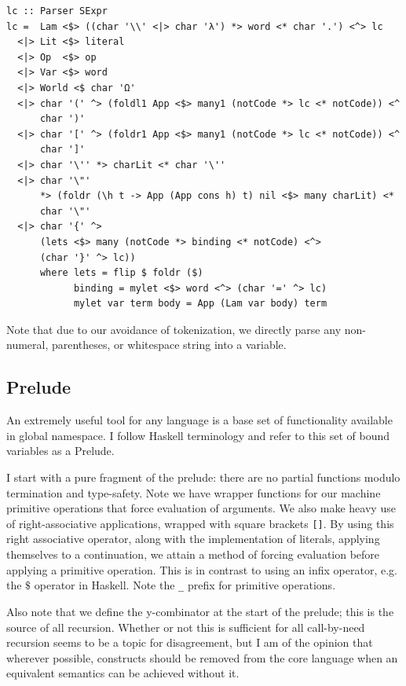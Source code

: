 \begin{verbatim}
lc :: Parser SExpr
lc =  Lam <$> ((char '\\' <|> char 'λ') *> word <* char '.') <^> lc
  <|> Lit <$> literal
  <|> Op  <$> op
  <|> Var <$> word
  <|> World <$ char 'Ω'
  <|> char '(' ^> (foldl1 App <$> many1 (notCode *> lc <* notCode)) <^ 
      char ')'
  <|> char '[' ^> (foldr1 App <$> many1 (notCode *> lc <* notCode)) <^ 
      char ']'
  <|> char '\'' *> charLit <* char '\''
  <|> char '\"' 
      *> (foldr (\h t -> App (App cons h) t) nil <$> many charLit) <* 
      char '\"'
  <|> char '{' ^> 
      (lets <$> many (notCode *> binding <* notCode) <^> 
      (char '}' ^> lc))
      where lets = flip $ foldr ($)
            binding = mylet <$> word <^> (char '=' ^> lc)
            mylet var term body = App (Lam var body) term
\end{verbatim}

Note that due to our avoidance of tokenization, we directly parse any
non-numeral, parentheses, or whitespace string into a variable.

\subsection{Prelude}
An extremely useful tool for any language is a base set of functionality
available in global namespace. I follow Haskell terminology and refer to this
set of bound variables as a Prelude. 

I start with a pure fragment of the prelude: there are no partial functions
modulo termination and type-safety. Note we have wrapper functions for our
machine primitive operations that force evaluation of arguments. We also make
heavy use of right-associative applications, wrapped with square brackets
\texttt{[]}. By using this right associative operator, along with the
implementation of literals, applying themselves to a continuation, we attain a
method of forcing evaluation before applying a primitive operation. This is in
contrast to using an infix operator, e.g. the $\$$ operator in Haskell. Note the
\texttt{\_} prefix for primitive operations. 

Also note that we define the y-combinator at the start of the prelude; this is
the source of all recursion. Whether or not this is sufficient for all
call-by-need recursion seems to be a topic for disagreement, but I am of the
opinion that wherever possible, constructs should be removed from the core
language when an equivalent semantics can be achieved without it.

